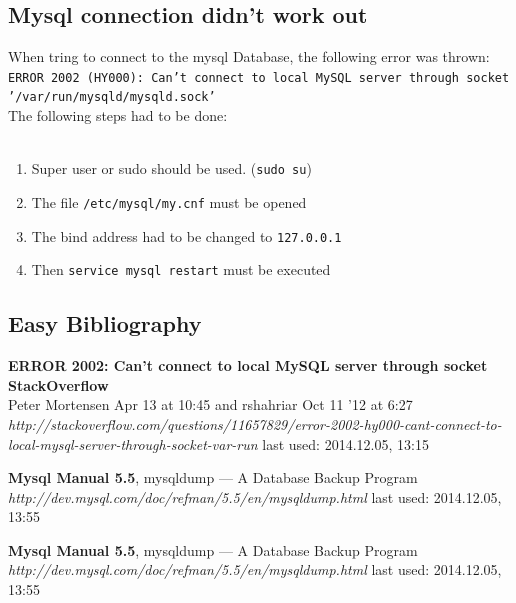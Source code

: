 \documentclass[10pt]{article}
\begin{document}
\subsection{Mysql connection didn't work out}
When tring to connect to the mysql Database, the following error was thrown:
\texttt{ERROR 2002 (HY000): Can't connect to local MySQL server through socket '/var/run/mysqld/mysqld.sock'} \\
The following steps had to be done: \\
\\ 
\begin{enumerate}
\item Super user or sudo should be used. (\texttt{sudo su}) 
\item The file \texttt{/etc/mysql/my.cnf} must be opened 
\item The bind address had to be changed to \texttt{127.0.0.1}
\item Then \texttt{service mysql restart} must be executed
\end{enumerate}
\cite{mysqlProblem1}



\subsection{Easy Bibliography}
\begin{thebibliography}{56}

  
  \textbf{ERROR 2002: Can't connect to local MySQL server through socket \\ StackOverflow} \\ Peter Mortensen Apr 13 at 10:45 and  rshahriar Oct 11 '12 at 6:27 \\
  \textit{http://stackoverflow.com/questions/11657829/error-2002-hy000-cant-connect-to-local-mysql-server-through-socket-var-run}
  \newline last used: 2014.12.05, 13:15
 
  \textbf{Mysql Manual 5.5}, mysqldump — A Database Backup Program\\
  \textit{http://dev.mysql.com/doc/refman/5.5/en/mysqldump.html}
  \newline last used: 2014.12.05, 13:55
  
  \textbf{Mysql Manual 5.5}, mysqldump — A Database Backup Program\\
  \textit{http://dev.mysql.com/doc/refman/5.5/en/mysqldump.html}
  \newline last used: 2014.12.05, 13:55
  



\end{thebibliography}
\end{document}
